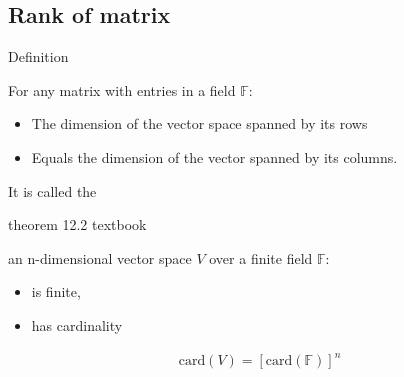 \subsection{Rank of matrix}
\begin{parag}{Definition}
   \begin{definition}
    For any matrix with entries in a field $\mathbb{F}$:
    \begin{itemize}
    \item The dimension of the vector space spanned by its rows
    \item  Equals the dimension of the vector spanned by its columns.
    \end{itemize}
    It is called the 
   \end{definition} 
\end{parag}

\begin{parag}{theorem 12.2 textbook}
    \begin{theoreme}
    an n-dimensional vector space $V$ over a finite field $\mathbb{F}$:
    \begin{itemize}
        \item is finite,
        \item has cardinality
    \end{itemize}

    
    \begin{align*} \text{card}\left(V\right) =  \left[\text{card}\left(\mathbb{F}\right)\right]^n \end{align*}
    \end{theoreme}
\end{parag}








